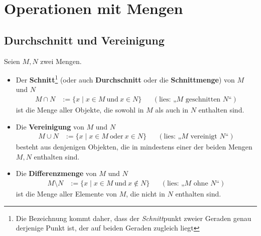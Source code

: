 \section{Operationen mit Mengen}


\subsection*{Durchschnitt und Vereinigung}


\begin{de}      \label{def:capcup}
    Seien $M,N$ zwei Mengen.
    \begin{itemize}
        \item Der \textbf{Schnitt}\footnote{Die Bezeichnung kommt daher, dass der \emph{Schnitt}punkt zweier Geraden genau derjenige Punkt ist, der auf beiden Geraden zugleich liegt} (oder auch \textbf{Durchschnitt} oder die \textbf{Schnittmenge}) von $M$ und $N$ 
        \begin{align*}
            M \cap N & := \{x \mid x \in M\ \text{und}\ x \in N\} && (\text{lies: „$M$ geschnitten $N$“})
        \end{align*}
        ist die Menge aller Objekte, die sowohl in $M$ als auch in $N$ enthalten sind.
        \item Die \textbf{Vereinigung} von $M$ und $N$
        \begin{align*}
            M \cup N & := \{x \mid x \in M\ \text{oder}\ x \in N\} && (\text{lies: „$M$ vereinigt $N$“})
        \end{align*}
        besteht aus denjenigen Objekten, die in mindestens einer der beiden Mengen $M,N$ enthalten sind.
        \item Die \textbf{Differenzmenge} von $M$ und $N$
        \begin{align*}
            M \setminus N & := \{ x \mid x \in M \ \text{und}\ x \notin N \}  && (\text{lies: „$M$ ohne $N$“})
        \end{align*}
        ist die Menge aller Elemente von $M$, die nicht in $N$ enthalten sind.


\end{itemize}
\end{de}
